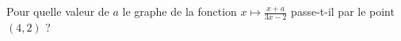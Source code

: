 
\begin{exercice}\label{exosmath-0335}

    Pour quelle valeur de \( a\) le graphe de la fonction \( x\mapsto\frac{ x+a }{ 3x-2 }\) passe-t-il par le point \( (4,2)\) ?

\end{exercice}
